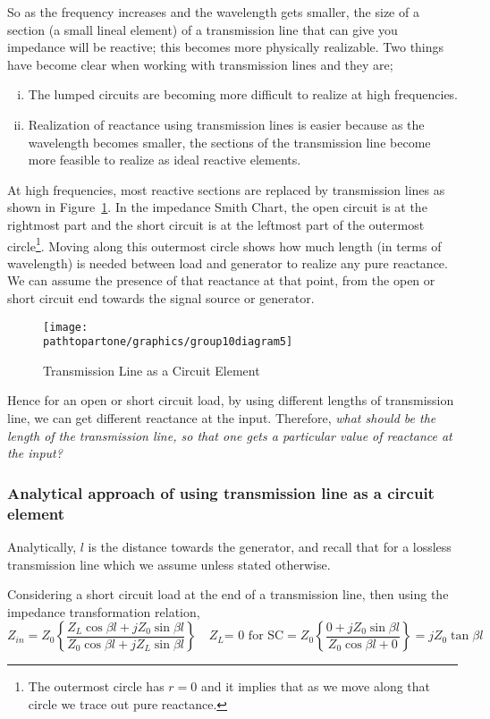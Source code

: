 So as the frequency increases and the wavelength gets smaller, the size of a section (a small lineal element) of a transmission line that can give you impedance will be reactive; this becomes more physically realizable. Two things have become clear when working with transmission
lines and they are;
\begin{enumerate}[(i)]
\item The lumped circuits are becoming more difficult to realize at high frequencies.
\item Realization of reactance using transmission lines is easier because as the wavelength becomes smaller, the sections of the transmission line become more feasible to realize as ideal reactive elements.
\end{enumerate}
At high frequencies, most reactive sections are replaced by transmission lines as shown in Figure~\ref{fig:group10diagram5}. In the impedance Smith Chart, the open circuit is at the rightmost part and the short circuit is at the leftmost part of the outermost circle\footnote{
The outermost circle has $r = 0$ and it implies that as we move along that circle we trace out pure reactance.
}. Moving along this outermost circle shows how much length (in terms of wavelength) is needed between load and generator to realize any pure reactance. We can assume the presence of that reactance at that point, from the open or short circuit end towards the signal source or generator.
\begin{figure}[h]
\centering
\texttt{[image: \\pathtopartone/graphics/group10diagram5]}
\caption{Transmission Line as a Circuit Element}
\label{fig:group10diagram5}
\end{figure}

Hence for an open or short circuit load, by using different lengths of transmission line, we can get different reactance at the input. Therefore, \emph{what should be the length of the transmission line, so that one gets a particular value of reactance at the input?}

\subsubsection{Analytical approach of using transmission line as a circuit element}
Analytically, $l$ is the distance towards the generator, and recall that for a lossless transmission line which we assume unless stated otherwise.

Considering a short circuit load at the end of a transmission line, then using the impedance transformation relation,
\begin{dmath}
Z_{in} = Z_0 \left\lbrace\frac{Z_{L}\cos\beta l + jZ_0\sin\beta l}{Z_0\cos\beta l + jZ_{L}\sin\beta l}\right\rbrace\quad Z_{L} \text{= 0 for SC} 
= Z_0 \left\lbrace \frac{0 + jZ_0\sin\beta l}{Z_0\cos\beta l + 0}\right\rbrace = jZ_0\tan\beta l
\label{eqn:zinshortcircuit}
\end{dmath}

